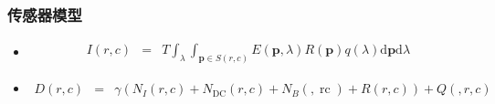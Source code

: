 \documentclass{beamer}
\newcommand{\mathd}{\mathrm{d}}
\newcommand{\tmmathbf}[1]{\ensuremath{\boldsymbol{#1}}}
\newcommand{\tmop}[1]{\ensuremath{\operatorname{#1}}}
\begin{document}
{{{{\begin{frame}
  {\hspace{8em}}
\end{frame}}{\begin{frame}
  \frametitle{传感器模型}
  \begin{itemize}
    \item
    \begin{eqnarray*}
      I (r, c) & = & T \int_{\lambda} \int_{\tmmathbf{p} \in S (r, c)} E
      (\tmmathbf{p}, \lambda) R (\tmmathbf{p}) q (\lambda) \mathd \tmmathbf{p}
      \mathd \lambda
    \end{eqnarray*}
    \item
    \begin{eqnarray*}
      D (r, c) & = & \gamma (N_I (r, c) + N_{\tmop{DC}} (r, c) + N_B (,
      \tmop{rc}) + R (r, c)) + Q (, r, c)
    \end{eqnarray*}
    
  \end{itemize}
\end{frame}}}}}
\end{document}
